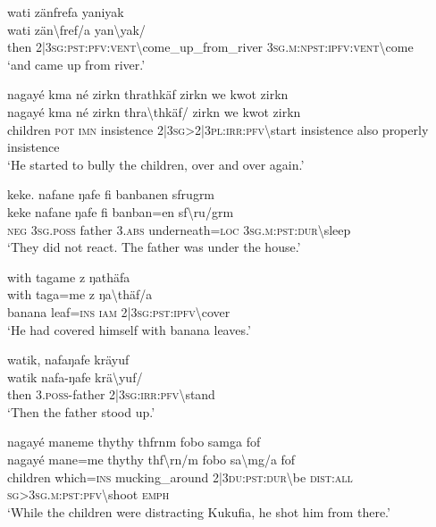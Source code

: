\newpage
\ea\label{ex:9:a4926}
wati zänfrefa yaniyak\\
\gll wati	zän{\textbackslash}fref/a	yan{\textbackslash}yak/\\
     then	2|3\textsc{sg}:\textsc{pst}:\textsc{pfv}:\textsc{vent}{\textbackslash}come\_up\_from\_river	3\textsc{sg}.\textsc{m}:\textsc{npst}:\textsc{ipfv}:\textsc{vent}{\textbackslash}come\\
\glt `and came up from river.'
\z

\ea\label{ex:9:a2324}
nagayé kma né zirkn thrathkäf zirkn we kwot zirkn\\
\gll nagayé	kma	né	zirkn	thra{\textbackslash}thkäf/	zirkn	we	kwot	zirkn\\
     children	\textsc{pot}	\textsc{imn}	insistence	2|3\textsc{sg}>2|3\textsc{pl}:\textsc{irr}:\textsc{pfv}{\textbackslash}start	insistence	also	properly	insistence\\
\glt `He started to bully the children, over and over again.'
\z

\ea\label{ex:9:a2326}
keke. nafane ŋafe fi banbanen sfrugrm\\
\gll keke	nafane	ŋafe	fi	banban=en	sf{\textbackslash}ru/grm\\
     \textsc{neg}	3\textsc{sg}.\textsc{poss}	father	3.\textsc{abs}	underneath=\textsc{loc}	3\textsc{sg}.\textsc{m}:\textsc{pst}:\textsc{dur}{\textbackslash}sleep\\
\glt `They did not react. The father was under the house.'
\z

\ea\label{ex:9:a2327}
with tagame z ŋathäfa\\
\gll with	taga=me	z	ŋa{\textbackslash}thäf/a\\
     banana	leaf=\textsc{ins}	\textsc{iam}	2|3\textsc{sg}:\textsc{pst}:\textsc{ipfv}{\textbackslash}cover\\
\glt `He had covered himself with banana leaves.'
\z

\ea\label{ex:9:a2328}
watik, nafaŋafe kräyuf\\
\gll watik	nafa-ŋafe	krä{\textbackslash}yuf/\\
     then	3.\textsc{poss}-father	2|3\textsc{sg}:\textsc{irr}:\textsc{pfv}{\textbackslash}stand\\
\glt `Then the father stood up.'
\z

\ea\label{ex:9:a2329}
nagayé maneme thythy thfrnm fobo samga fof\\
\gll nagayé	mane=me	thythy	thf{\textbackslash}rn/m	fobo	sa{\textbackslash}mg/a	fof\\
     children	which=\textsc{ins}	mucking\_around	2|3\textsc{du}:\textsc{pst}:\textsc{dur}{\textbackslash}be	\textsc{dist}:\textsc{all}	\textsc{sg}>3\textsc{sg}.\textsc{m}:\textsc{pst}:\textsc{pfv}{\textbackslash}shoot	\textsc{emph}\\
\glt `While the children were distracting Kukufia, he shot him from there.'
\z


